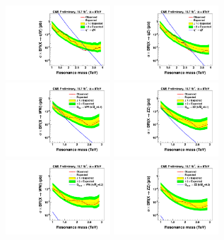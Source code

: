\begin{figure}[h!tpb]
\begin{center}
\includegraphics[width=0.35\textwidth]{EXO-12-024/figs/limits/brazilianFlag_qW_high_purity.pdf}
\includegraphics[width=0.35\textwidth]{EXO-12-024/figs/limits/brazilianFlag_qZ_high_purity.pdf}\\
\includegraphics[width=0.35\textwidth]{EXO-12-024/figs/limits/brazilianFlag_RS1WW_high_purity.pdf}
\includegraphics[width=0.35\textwidth]{EXO-12-024/figs/limits/brazilianFlag_RS1ZZ_high_purity.pdf}\\
\includegraphics[width=0.35\textwidth]{EXO-12-024/figs/limits/brazilianFlag_BulkWW_high_purity.pdf}
\includegraphics[width=0.35\textwidth]{EXO-12-024/figs/limits/brazilianFlag_BulkZZ_high_purity.pdf}\\

\end{center}
\end{figure}
